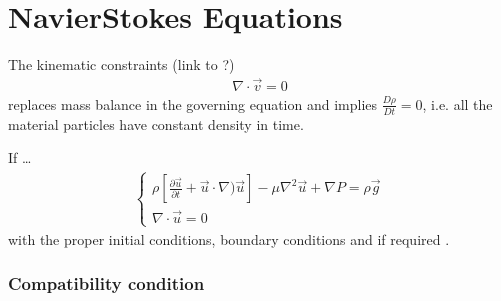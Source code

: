 \documentclass[letterpaper,10pt,english]{jupyterBook}
\begin{document}
\section{Navier\sphinxhyphen{}Stokes Equations}
\label{\detokenize{ch/fluids/incompressible:navier-stokes-equations}}\label{\detokenize{ch/fluids/incompressible:fluid-mechanics-incompressible-ns-eqn}}
\sphinxAtStartPar
The kinematic constraints (link to {\hyperref[\detokenize{ch/fluids/dimensional-analysis:fluid-mechanics-dimensional-analysis}]{}}?)
\begin{equation*}
\begin{split}\nabla \cdot \vec{v} = 0\end{split}
\end{equation*}
\sphinxAtStartPar
replaces mass balance in the governing equation and implies \(\frac{D \rho}{D t} = 0\), i.e. all the material particles have constant density in time.

\sphinxAtStartPar
If …
\begin{equation}\label{equation:ch/fluids/incompressible:eq:ns-eqn}
\begin{split}\begin{cases}
\rho \left[ \frac{\partial \vec{u}}{\partial t} + \vec{u} \cdot \nabla ) \vec{u} \right] - \mu \nabla^2 \vec{u} + \nabla P = \rho \vec{g} \\
\nabla \cdot \vec{u} = 0
\end{cases}\end{split}
\end{equation}
\sphinxAtStartPar
with the proper initial conditions, boundary conditions and \sphinxhyphen{} if required \sphinxhyphen{} {\hyperref[\detokenize{ch/fluids/incompressible:fluid-mechanics-incompressible-compatibility}]{}}.

\label{\detokenize{ch/fluids/incompressible:fluid-mechanics-incompressible-compatibility}}\subsubsection*{Compatibility condition}
\end{document}
